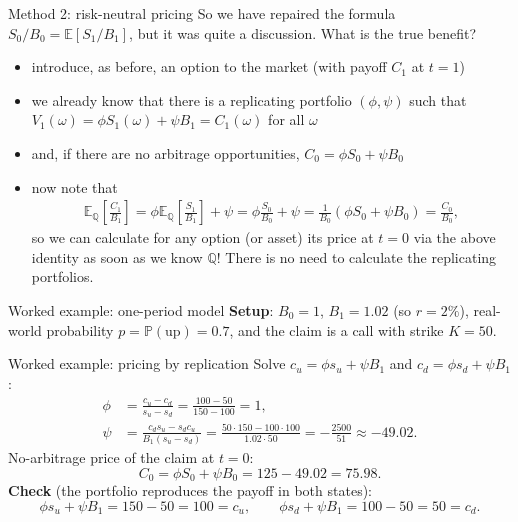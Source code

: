 \documentclass[pdf, handout]{beamer}
\begin{document}
\begin{frame}{Method 2: risk-neutral pricing}
So we have repaired the formula  $S_0/B_0 = \mathbb{E}[S_1/B_1]$, but it 
was quite a discussion.  What is the true benefit?
\begin{itemize}
\item introduce, as before, an option to the market (with payoff $C_1$ at $t=1$)
\item we already know that there is a replicating portfolio $(\phi,\psi)$ such that $V_1(\omega) =\phi S_1(\omega) + \psi B_1= C_1(\omega)$ for all $\omega$
\item and, if there are no arbitrage opportunities, $C_0=\phi S_0 + \psi B_0$
\item now note that
\begin{align*}
\mathbb{E}_{\mathbb{Q}}\left[ \frac{C_1} {B_1} \right]
=\phi \mathbb{E}_{\mathbb{Q}}\left[ \frac{S_1} {B_1} \right]
+\psi = \phi \frac{S_0}{B_0} + \psi = \frac{1}{B_0}( \phi S_0 + \psi B_0)=\frac{C_0}{B_0}, 
\end{align*}
so we can calculate for any option (or asset) its price at $t=0$ via the above identity as soon as we know $\mathbb{Q}$! There is no need to calculate 
the replicating portfolios. 
\end{itemize}
\end{frame}

\begin{frame}{Worked example: one-period model}
\textbf{Setup}: $B_0=1$, $B_1=1.02$ (so $r=2\%$), real-world probability $p=\mathbb{P}(\text{up})=0.7$, and the claim is a call with strike $K=50$.
\vspace{0.4cm}
\begin{center}
\end{center}
\end{frame}

\begin{frame}{Worked example: pricing by replication}
Solve $c_u=\phi s_u+\psi B_1$ and $c_d=\phi s_d+\psi B_1$:
\begin{align*}
\phi &= \frac{c_u-c_d}{s_u-s_d}=\frac{100-50}{150-100}=1,\\[2pt]
\psi &= \frac{c_d s_u - s_d c_u}{B_1(s_u-s_d)}=\frac{50\cdot150-100\cdot100}{1.02\cdot 50}=-\frac{2500}{51}\approx -49.02 .
\end{align*}
No-arbitrage price of the claim at $t=0$:
\[
C_0=\phi S_0+\psi B_0 = 125 - 49.02 = 75.98 .
\]
\textbf{Check} (the portfolio reproduces the payoff in both states):
\[
\phi s_u+\psi B_1 = 150-50 = 100 = c_u,\qquad
\phi s_d+\psi B_1 = 100-50 = 50 = c_d .
\]
\end{frame}
\end{document}
